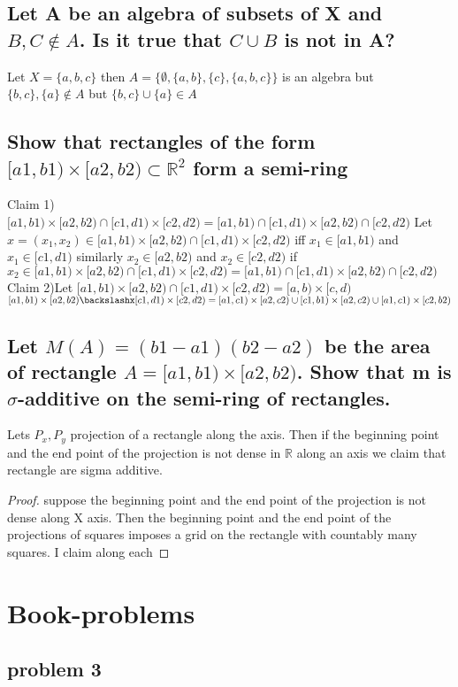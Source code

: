 \documentclass[paper=letter, fontsize=11pt]{scrartcl} %
\begin{document}
\subsection{Let A be an algebra of subsets of X and $B, C \not \in A$. Is it true that $C \cup B$ is not in A?}
Let $X=\{a,b,c\}$ then $A=\{\emptyset,\{a,b\},\{c\},\{a,b,c\}\}$ is an algebra but $\{b,c\},\{a\} \not \in A$ but $\{b,c\} \cup \{a\}  \in A$ 
\subsection{Show that rectangles of the form $[a1, b1) \times [a2, b2) \subset \mathbb{R}^2$ form a semi-ring}
Claim 1) $[a1, b1) \times [a2, b2) \cap [c1, d1) \times [c2, d2)= [a1,b1) \cap [c1,d1) \times [a2,b2) \cap [c2,d2)$ Let $x=(x_1,x_2) \in [a1, b1) \times [a2, b2) \cap [c1, d1) \times [c2, d2)$ iff $x_1 \in [a1,b1)$ and  $x_1 \in [c1,d1)$ similarly $x_2 \in [a2,b2)$ and $x_2 \in [c2,d2)$ if $x_2 \in [a1, b1) \times [a2, b2) \cap [c1, d1) \times [c2, d2) = [a1,b1) \cap [c1,d1) \times [a2,b2) \cap [c2,d2)$\\
 Claim 2)Let $[a1, b1) \times [a2, b2) \cap [c1, d1) \times [c2, d2)=[a,b) \times[c,d)$
 $[a1, b1) \times[a2, b2) \backslashx [c1, d1) \times [c2, d2)=[a1,c1)\times[a2,c2) \cup [c1,b1)\times [a2,c2)\cup [a1,c1) \times [c2,b2)$
 \subsection{Let $M(A)=(b1-a1)(b2-a2)$ be the area of rectangle $A = [a1, b1) \times [a2, b2)$. Show that m is $\sigma$-additive on the semi-ring of rectangles.}
 Lets $P_x,P_y$ projection of a rectangle along the axis. Then if the beginning point and the end point of the projection is not dense in $\mathbb{R}$ along an axis we claim that rectangle are sigma additive. 
 \begin{proof}
 suppose the beginning point and the end point of the projection is not dense along X axis. Then the beginning point and the end point of the projections of squares imposes a grid on the rectangle with countably many squares. I claim along each 
 \end{proof}
\section{Book-problems}
\subsection*{problem 3}
\newpage
\end{document}
